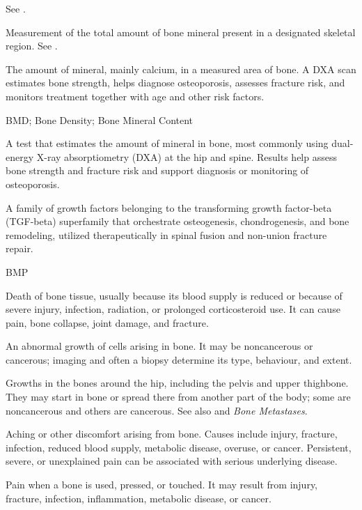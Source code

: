  See .

 Measurement of the total amount of bone mineral present in a designated skeletal region. See .

 The amount of mineral, mainly calcium, in a measured area of bone. A DXA scan estimates bone strength, helps diagnose osteoporosis, assesses fracture risk, and monitors treatment together with age and other risk factors.

\synonyms
BMD; Bone Density; Bone Mineral Content

 A test that estimates the amount of mineral in bone, most commonly using dual-energy X-ray absorptiometry (DXA) at the hip and spine. Results help assess bone strength and fracture risk and support diagnosis or monitoring of osteoporosis.

 A family of growth factors belonging to the transforming growth factor-beta (TGF-beta) superfamily that orchestrate osteogenesis, chondrogenesis, and bone remodeling, utilized therapeutically in spinal fusion and non-union fracture repair.

\synonyms
BMP

 Death of bone tissue, usually because its blood supply is reduced or because of severe injury, infection, radiation, or prolonged corticosteroid use. It can cause pain, bone collapse, joint damage, and fracture.

 An abnormal growth of cells arising in bone. It may
be noncancerous or cancerous; imaging and often a biopsy determine its type,
behaviour, and extent.

 Growths in the bones around the hip, including the pelvis and upper thighbone. They may start in bone or spread there from another part of the body; some are noncancerous and others are cancerous. See also  and \textit{Bone Metastases}.

 Aching or other discomfort arising from bone. Causes include injury, fracture, infection, reduced blood supply, metabolic disease, overuse, or cancer. Persistent, severe, or unexplained pain can be associated with serious underlying disease.

 Pain when a bone is used, pressed, or touched. It may result from injury, fracture, infection, inflammation, metabolic disease, or cancer.

